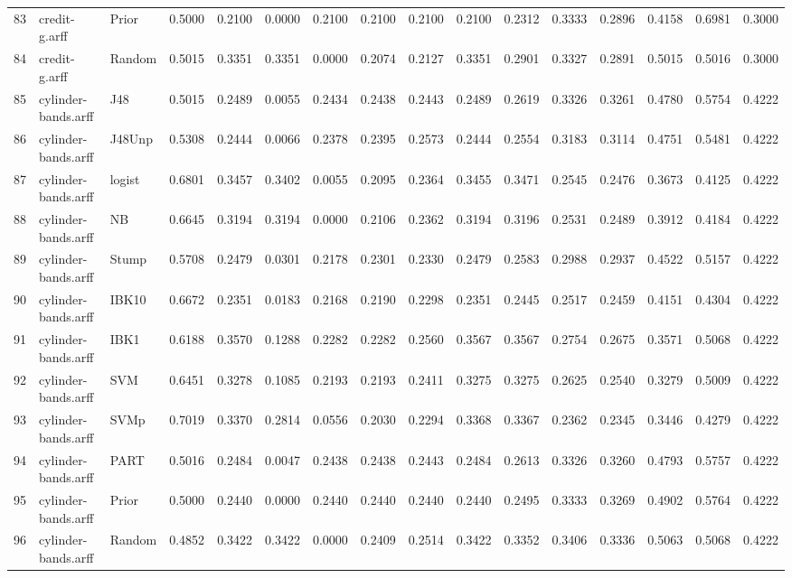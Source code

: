 \documentclass {article}
\begin{document}
\begin{table}[ht]
\begin{tabular}{rllrrrrrrrrrrrrr}
  83 & credit-g.arff & Prior & 0.5000 & 0.2100 & 0.0000 & 0.2100 & 0.2100 & 0.2100 & 0.2100 & 0.2312 & 0.3333 & 0.2896 & 0.4158 & 0.6981 & 0.3000 \\ 
  84 & credit-g.arff & Random & 0.5015 & 0.3351 & 0.3351 & 0.0000 & 0.2074 & 0.2127 & 0.3351 & 0.2901 & 0.3327 & 0.2891 & 0.5015 & 0.5016 & 0.3000 \\ 
  85 & cylinder-bands.arff & J48 & 0.5015 & 0.2489 & 0.0055 & 0.2434 & 0.2438 & 0.2443 & 0.2489 & 0.2619 & 0.3326 & 0.3261 & 0.4780 & 0.5754 & 0.4222 \\ 
  86 & cylinder-bands.arff & J48Unp & 0.5308 & 0.2444 & 0.0066 & 0.2378 & 0.2395 & 0.2573 & 0.2444 & 0.2554 & 0.3183 & 0.3114 & 0.4751 & 0.5481 & 0.4222 \\ 
  87 & cylinder-bands.arff & logist & 0.6801 & 0.3457 & 0.3402 & 0.0055 & 0.2095 & 0.2364 & 0.3455 & 0.3471 & 0.2545 & 0.2476 & 0.3673 & 0.4125 & 0.4222 \\ 
  88 & cylinder-bands.arff & NB & 0.6645 & 0.3194 & 0.3194 & 0.0000 & 0.2106 & 0.2362 & 0.3194 & 0.3196 & 0.2531 & 0.2489 & 0.3912 & 0.4184 & 0.4222 \\ 
  89 & cylinder-bands.arff & Stump & 0.5708 & 0.2479 & 0.0301 & 0.2178 & 0.2301 & 0.2330 & 0.2479 & 0.2583 & 0.2988 & 0.2937 & 0.4522 & 0.5157 & 0.4222 \\ 
  90 & cylinder-bands.arff & IBK10 & 0.6672 & 0.2351 & 0.0183 & 0.2168 & 0.2190 & 0.2298 & 0.2351 & 0.2445 & 0.2517 & 0.2459 & 0.4151 & 0.4304 & 0.4222 \\ 
  91 & cylinder-bands.arff & IBK1 & 0.6188 & 0.3570 & 0.1288 & 0.2282 & 0.2282 & 0.2560 & 0.3567 & 0.3567 & 0.2754 & 0.2675 & 0.3571 & 0.5068 & 0.4222 \\ 
  92 & cylinder-bands.arff & SVM & 0.6451 & 0.3278 & 0.1085 & 0.2193 & 0.2193 & 0.2411 & 0.3275 & 0.3275 & 0.2625 & 0.2540 & 0.3279 & 0.5009 & 0.4222 \\ 
  93 & cylinder-bands.arff & SVMp & 0.7019 & 0.3370 & 0.2814 & 0.0556 & 0.2030 & 0.2294 & 0.3368 & 0.3367 & 0.2362 & 0.2345 & 0.3446 & 0.4279 & 0.4222 \\ 
  94 & cylinder-bands.arff & PART & 0.5016 & 0.2484 & 0.0047 & 0.2438 & 0.2438 & 0.2443 & 0.2484 & 0.2613 & 0.3326 & 0.3260 & 0.4793 & 0.5757 & 0.4222 \\ 
  95 & cylinder-bands.arff & Prior & 0.5000 & 0.2440 & 0.0000 & 0.2440 & 0.2440 & 0.2440 & 0.2440 & 0.2495 & 0.3333 & 0.3269 & 0.4902 & 0.5764 & 0.4222 \\ 
  96 & cylinder-bands.arff & Random & 0.4852 & 0.3422 & 0.3422 & 0.0000 & 0.2409 & 0.2514 & 0.3422 & 0.3352 & 0.3406 & 0.3336 & 0.5063 & 0.5068 & 0.4222 \\ 

\end{tabular}
\end{table}
\end{document}
